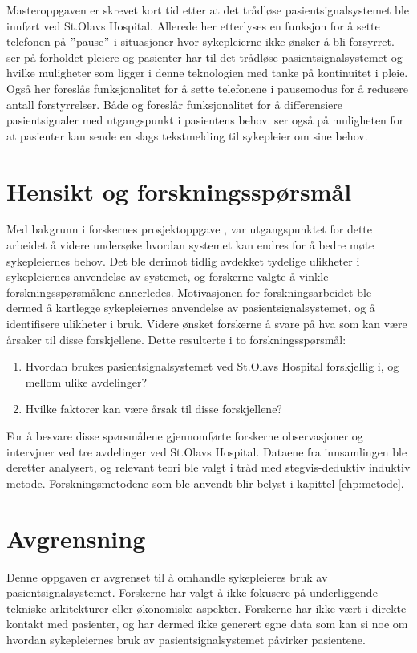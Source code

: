 \noindent
Masteroppgaven \citep{Sletten09} er skrevet kort tid etter at det trådløse pasientsignalsystemet ble innført ved St.Olavs Hospital. Allerede her etterlyses en funksjon for å sette telefonen på $"$pause$"$ i situasjoner hvor sykepleierne ikke ønsker å bli forsyrret. \citet{Rygh13} ser på forholdet pleiere og pasienter har til det trådløse pasientsignalsystemet og hvilke muligheter som ligger i denne teknologien med tanke på kontinuitet i pleie. Også her foreslås funksjonalitet for å sette telefonene i pausemodus for å redusere antall forstyrrelser. Både \citep{Rygh13} og \citep{Selseth12} foreslår funksjonalitet for å differensiere pasientsignaler med utgangspunkt i pasientens behov. \citet{Selseth12} ser også på muligheten for at pasienter kan sende en slags tekstmelding til sykepleier om sine behov.

\section{Hensikt og forskningsspørsmål}
Med bakgrunn i forskernes prosjektoppgave \citep{Sund13}, var utgangspunktet for dette arbeidet å videre undersøke hvordan systemet kan endres for å bedre møte sykepleiernes behov. Det ble derimot tidlig avdekket tydelige ulikheter i sykepleiernes anvendelse av systemet, og forskerne valgte å vinkle forskningsspørsmålene annerledes. Motivasjonen for forskningsarbeidet ble dermed å kartlegge sykepleiernes anvendelse av pasientsignalsystemet, og å identifisere ulikheter i bruk. Videre ønsket forskerne å svare på hva som kan være årsaker til disse forskjellene. Dette resulterte i to forskningsspørsmål:

\begin{enumerate}
\item Hvordan brukes pasientsignalsystemet ved St.Olavs Hospital forskjellig i, og mellom ulike avdelinger? 
\item Hvilke faktorer kan være årsak til disse forskjellene?
\end{enumerate}

\noindent
For å besvare disse spørsmålene gjennomførte forskerne observasjoner og intervjuer ved tre avdelinger ved St.Olavs Hospital. Dataene fra innsamlingen ble deretter analysert, og relevant teori ble valgt i tråd med stegvis-deduktiv induktiv metode. Forskningsmetodene som ble anvendt blir belyst i kapittel \ref{chp:metode}.

\section{Avgrensning}
Denne oppgaven er avgrenset til å omhandle sykepleieres bruk av pasientsignalsystemet. Forskerne har valgt å ikke fokusere på underliggende tekniske arkitekturer eller økonomiske aspekter. Forskerne har ikke vært i direkte kontakt med pasienter, og har dermed ikke generert egne data som kan si noe om hvordan sykepleiernes bruk av pasientsignalsystemet påvirker pasientene. 

